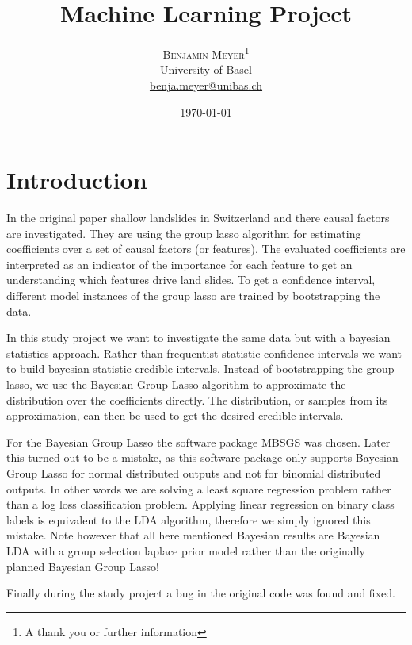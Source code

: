 \documentclass[twoside,twocolumn]{article}
\title{Machine Learning Project} %
\author{%
\textsc{Benjamin Meyer}\thanks{A thank you or further information} \\[1ex] %
\normalsize University of Basel \\ %
\normalsize \href{mailto:benja.meyer@unibas.ch}{benja.meyer@unibas.ch} %
}
\date{\today} %
\begin{document}
\maketitle


\section{Introduction}

In the original paper \cite{zweifel_samarin_meusburger_alewell_2021} shallow landslides in Switzerland and there causal factors are investigated.
They are using the group lasso algorithm \cite{group_lasso} for estimating coefficients over a set of causal factors (or features).
The evaluated coefficients are interpreted as an indicator of the importance for each feature to get an understanding which features drive land slides.
To get a confidence interval, different model instances of the group lasso are trained by bootstrapping the data.

In this study project we want to investigate the same data but with a bayesian statistics approach.
Rather than frequentist statistic confidence intervals we want to build bayesian statistic credible intervals.
Instead of bootstrapping the group lasso, we use the Bayesian Group Lasso algorithm \cite{bayesian_group_lasso} to approximate the distribution over the coefficients directly.
The distribution, or samples from its approximation, can then be used to get the desired credible intervals.

For the Bayesian Group Lasso the software package MBSGS \cite{MBSGS} was chosen.
Later this turned out to be a mistake, as this software package only supports Bayesian Group Lasso for normal distributed outputs and not for binomial distributed outputs.
In other words we are solving a least square regression problem rather than a log loss classification problem.
Applying linear regression on binary class labels is equivalent to the LDA algorithm, therefore we simply ignored this mistake.
Note however that all here mentioned Bayesian results are Bayesian LDA with a group selection laplace prior model rather than the originally planned Bayesian Group Lasso!

Finally during the study project a bug in the original code was found and fixed.
\end{document}
